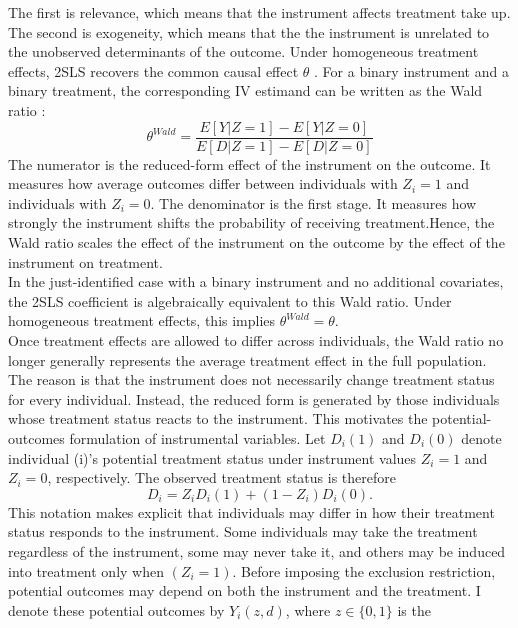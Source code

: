 \documentclass[12pt, a4paper, oneside]{article}
\theoremstyle{plain}
\theoremstyle{definition}
\begin{document}
The first is relevance, which means that the instrument affects treatment take up.
The second is exogeneity, which means that the the instrument is unrelated to the unobserved determinants of the outcome.
Under homogeneous treatment effects, 2SLS recovers the common causal effect $\theta$ \citep{angrist1995identification,angrist1996identification}.
For a binary instrument and a binary treatment, the corresponding IV estimand can be written as the Wald ratio \citep{wald1940fitting}:
\begin{equation}
    \theta^{Wald} = \frac{E[Y|Z=1] - E[Y|Z=0]}{E[D|Z=1] - E[D|Z=0]}
\end{equation}
The numerator is the reduced-form effect of the instrument on the outcome. It measures how average outcomes differ between individuals with $Z_i=1$ and individuals with $Z_i=0$. 
The denominator is the first stage. It measures how strongly the instrument shifts the probability of receiving treatment.Hence, the Wald ratio scales the effect of the instrument on the outcome by the effect of the instrument on treatment.\\
In the just-identified case with a binary instrument and no additional covariates, the 2SLS coefficient is algebraically equivalent to this Wald ratio. Under homogeneous treatment effects, this implies $\theta^{Wald}=\theta$.\\
Once treatment effects are allowed to differ across individuals, the Wald ratio no longer generally represents the average treatment effect in the full population. The reason is that the instrument does not necessarily change treatment status for every individual. Instead, the reduced form is generated by those individuals whose treatment status reacts to the instrument. This motivates the potential-outcomes formulation of instrumental variables.
Let $D_i(1)$ and $D_i(0)$ denote individual (i)'s potential treatment status under instrument values $Z_i=1$ and $Z_i=0$, respectively. The observed treatment status is therefore
\begin{equation}
    D_i = Z_iD_i(1)+(1-Z_i)D_i(0).
\end{equation}
This notation makes explicit that individuals may differ in how their treatment status responds to the instrument.
Some individuals may take the treatment regardless of the instrument, some may never take it, and others may be induced into treatment only when $(Z_i=1)$.
Before imposing the exclusion restriction, potential outcomes may depend on both the instrument and the treatment.
I denote these potential outcomes by $Y_i(z,d)$, where $z \in \{0,1\}$ is the 
\end{document}
